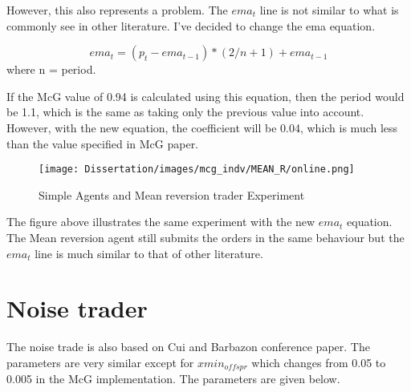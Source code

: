 However, this also represents a problem. The $ema_{t}$ line is not similar to what is commonly see in other literature. I've decided to change the ema equation. 

\begin{equation}
ema_t = (p_{t} - ema_{t-1}) * (2 / n + 1) + ema_{t-1} 
\end{equation}
where n = period.

If the McG value of 0.94 is calculated using this equation, then the period would be 1.1, which is the same as taking only the previous value into account. However, with the new equation, the coefficient will be 0.04, which is much less than the value specified in McG paper. 

\begin{figure}[h]
\texttt{[image: Dissertation/images/mcg\_indv/MEAN\_R/online.png]}
\caption{Simple Agents and Mean reversion trader Experiment} 
\end{figure} 
\FloatBarrier

The figure above illustrates the same experiment with the new $ema_t$ equation. The Mean reversion agent still submits the orders in the same behaviour but the $ema_t$ line is much similar to that of other literature. 

\section{Noise trader} 
The noise trade is also based on Cui and Barbazon \cite{CuiNoise} conference paper. The parameters are very similar except for $xmin_{offspr}$ which changes from 0.05 to 0.005 in the McG implementation. The parameters are given below. 

